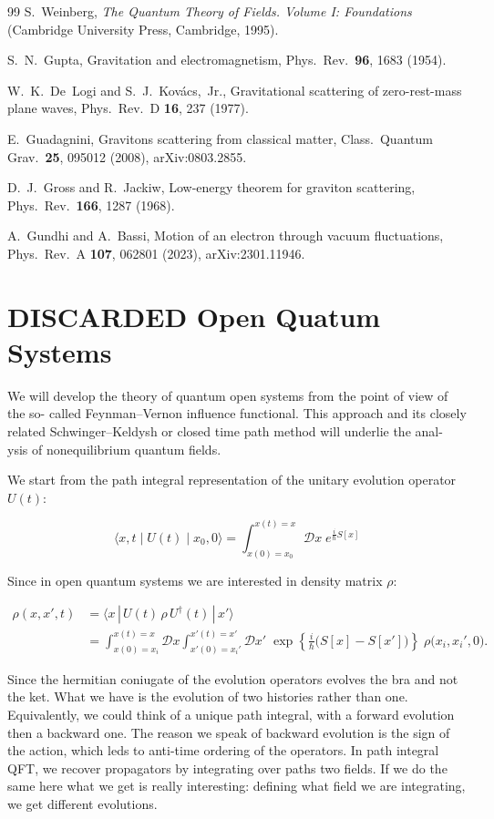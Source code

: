 \documentclass[12pt,a4paper,oneside]{article}
\numberwithin{equation}{section}   %
\begin{document}
\begin{thebibliography}{99}
S.~Weinberg,
\textit{The Quantum Theory of Fields. Volume I: Foundations}
(Cambridge University Press, Cambridge, 1995).

S.~N.~Gupta,
Gravitation and electromagnetism,
Phys.\ Rev.\ \textbf{96}, 1683 (1954).

W.~K.~De~Logi and S.~J.~Kov\'acs,~Jr.,
Gravitational scattering of zero-rest-mass plane waves,
Phys.\ Rev.\ D \textbf{16}, 237 (1977).

E.~Guadagnini,
Gravitons scattering from classical matter,
Class.\ Quantum Grav.\ \textbf{25}, 095012 (2008),
arXiv:0803.2855.

D.~J.~Gross and R.~Jackiw,
Low-energy theorem for graviton scattering,
Phys.\ Rev.\ \textbf{166}, 1287 (1968).

A.~Gundhi and A.~Bassi,
Motion of an electron through vacuum fluctuations,
Phys.\ Rev.\ A \textbf{107}, 062801 (2023),
arXiv:2301.11946.

\end{thebibliography}

\section{DISCARDED Open Quatum Systems}
We will develop the theory of quantum open systems from the point of view of the so-
called Feynman–Vernon influence functional. This approach and its closely
related Schwinger–Keldysh or closed time path method will underlie the anal-
ysis of nonequilibrium quantum fields.

We start from the path integral representation of the unitary evolution operator $U(t)$:

\[
\langle x,t\mid U(t)\mid x_0,0\rangle = \int_{x(0)=x_0}^{x(t)=x} \mathcal{D}x\; e^{\tfrac{i}{\hbar}S[x]}
\]

Since in open quantum systems we are interested in density matrix $\rho$:

\begin{align}
\rho(x,x',t) &= \langle x\,|\,U(t)\,\rho\,U^\dagger(t)\,|\,x'\rangle \\
&= \int_{x(0)=x_i}^{x(t)=x}\mathcal{D}x\int_{x'(0)=x_i'}^{x'(t)=x'}\mathcal{D}x'\;\exp\left\{\frac{i}{\hbar}\big(S[x]-S[x']\big)\right\}\;\rho\big(x_i,x_i',0\big).
\end{align}

Since the hermitian coniugate of the evolution operators evolves the bra and not the ket.
What we have is the evolution of two histories rather than one. 
Equivalently, we could think of a unique path integral, with a forward evolution then a 
backward one. The reason we speak of backward evolution is the sign
of the action, which leds to anti-time ordering of the operators. In path integral QFT,
we recover propagators by integrating over paths two fields. If we do the same 
here what we get is really interesting: defining what field we are integrating, we get
different evolutions.
\end{document}
